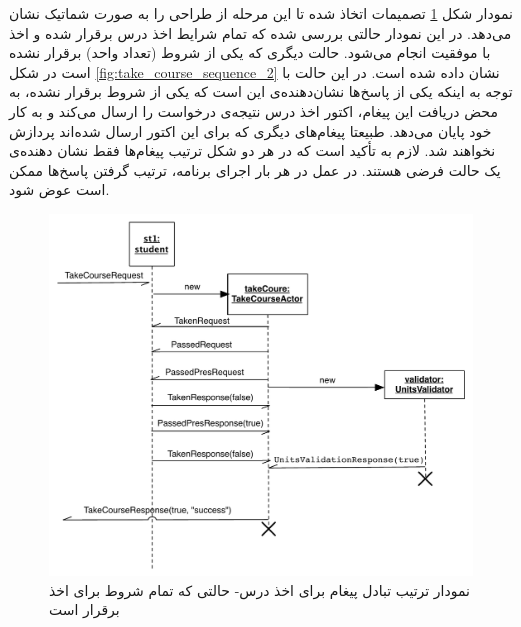 نمودار شکل \ref{fig:take_course_sequence_1} تصمیمات اتخاذ شده تا این مرحله از طراحی را به صورت شماتیک نشان می‌دهد. در این نمودار حالتی بررسی شده که تمام شرایط اخذ درس برقرار شده و اخذ با موفقیت انجام می‌شود. حالت دیگری که یکی از شروط (تعداد واحد) برقرار نشده است در شکل \ref{fig:take_course_sequence_2} نشان داده شده است. در این حالت با توجه به اینکه یکی از پاسخ‌ها نشان‌دهنده‌ی این است که یکی از شروط برقرار نشده،‌ به محض دریافت این پیغام، اکتور اخذ درس نتیجه‌ی درخواست را ارسال می‌کند و به کار خود پایان می‌دهد. طبیعتا پیغام‌های دیگری که برای این اکتور ارسال شده‌اند پردازش نخواهند شد.
لازم به تأکید است که در هر دو شکل ترتیب پیغام‌ها فقط نشان دهنده‌ی یک حالت فرضی هستند. در عمل در هر بار اجرای برنامه، ترتیب گرفتن پاسخ‌ها ممکن است عوض شود.

\begin{figure}
    \begin{center}
	\includegraphics[width=14cm]{4-ProposedFramework/Figures/take_course_seq1.pdf}
    \end{center}
    \caption{\label{fig:take_course_sequence_1} نمودار ترتیب تبادل پیغام‌ برای اخذ درس- حالتی که تمام شروط برای اخذ برقرار است }
\end{figure}

